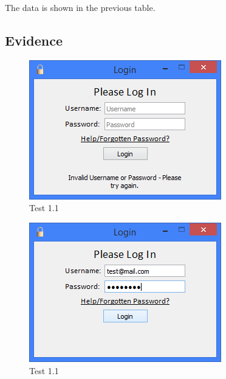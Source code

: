 \begin{landscape}
The data is shown in the previous table.

\subsection{Evidence}

\begin{figure}[H]
    \includegraphics[width=\textwidth]{./Testing/Evidence/LoginTestFail.png}
    \caption{Test 1.1}  \label{fig:LoginTestFail}
\end{figure}

\begin{figure}[H]
    \includegraphics[width=\textwidth]{./Testing/Evidence/LoginTestSucceed.png}
    \caption{Test 1.1}  \label{fig:LoginTestSucceed}
\end{figure}


\end{landscape}
